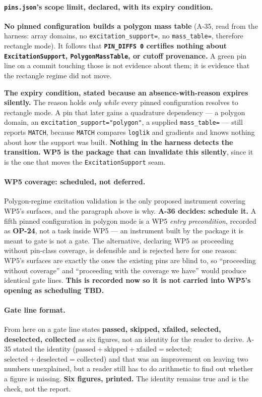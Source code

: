 \documentclass[
  10pt,
]{article}
\begin{document}
\paragraph{\texttt{pins.json}'s scope limit, declared, with its expiry condition.}
\textbf{No pinned configuration builds a polygon mass table} (A-35, read from the harness: array domains, no \texttt{excitation\_support=}, no \texttt{mass\_table=}, therefore rectangle mode). It follows that \textbf{\texttt{PIN\_DIFFS 0} certifies nothing about \texttt{ExcitationSupport}, \texttt{PolygonMassTable}, or cutoff provenance.} A green pin line on a commit touching those is not evidence about them; it is evidence that the rectangle regime did not move.

\textbf{The expiry condition, stated because an absence-with-reason expires silently.} The reason holds \emph{only while} every pinned configuration resolves to rectangle mode. A pin that later gains a quadrature dependency --- a polygon domain, an \texttt{excitation\_support="polygon"}, a supplied \texttt{mass\_table=} --- still reports \texttt{MATCH}, because \texttt{MATCH} compares \texttt{loglik} and gradients and knows nothing about how the support was built. \textbf{Nothing in the harness detects the transition.} \textbf{WP5 is the package that can invalidate this silently}, since it is the one that moves the \texttt{ExcitationSupport} seam.

\paragraph{WP5 coverage: scheduled, not deferred.}
Polygon-regime excitation validation is the only proposed instrument covering WP5's surfaces, and the paragraph above is why. \textbf{A-36 decides: schedule it.} A fifth pinned configuration in polygon mode is a WP5 \emph{entry precondition}, recorded as \textbf{OP-24}, not a task inside WP5 --- an instrument built by the package it is meant to gate is not a gate. The alternative, declaring WP5 as proceeding without pin-class coverage, is defensible and is rejected here for one reason: WP5's surfaces are exactly the ones the existing pins are blind to, so ``proceeding without coverage'' and ``proceeding with the coverage we have'' would produce identical gate lines. \textbf{This is recorded now so it is not carried into WP5's opening as scheduling TBD.}

\paragraph{Gate line format.}
From here on a gate line states \textbf{passed, skipped, xfailed, selected, deselected, collected} as six figures, not an identity for the reader to derive. A-35 stated the identity ($\text{passed} + \text{skipped} + \text{xfailed} = \text{selected}$; $\text{selected} + \text{deselected} = \text{collected}$) and that was an improvement on leaving two numbers unexplained, but a reader still has to do arithmetic to find out whether a figure is missing. \textbf{Six figures, printed.} The identity remains true and is the check, not the report.
\end{document}
